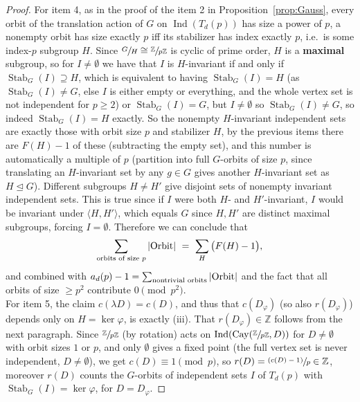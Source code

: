 \documentclass{article}
\theoremstyle{plain}
\theoremstyle{definition}
\theoremstyle{remark}
\newcommand{\Z}{\mathbb{Z}}
\newcommand{\quot}[2]{\sfrac{#1}{#2}}
\DeclareMathOperator{\Cay}{Cay}
\DeclareMathOperator{\Stab}{Stab}
\DeclareMathOperator{\Ind}{Ind}
\begin{document}
\begin{proof}
For item 4, as in the proof of the item 2 in Proposition~\ref{prop:Gauss}, every orbit of the translation action of $G$ on $\Ind(T_d(p))$ has size a power of $p$, a nonempty orbit has size exactly $p$ iff its stabilizer has index exactly $p$, i.e.\ is some index-$p$ subgroup $H$. Since $\sfrac{G}{H}\cong\quot\Z{p\Z}$ is cyclic of prime order, $H$ is a \textbf{maximal} subgroup, so for $I\ne\emptyset$ we have that $I$ is $H$-invariant if and only if $\Stab_G(I)\supseteq H$, which is equivalent to having $\Stab_G(I)=H$ (as $\Stab_G(I)\ne G$, else $I$ is either empty or everything, and the whole vertex set is not independent for $p\ge2$) or $\Stab_G(I)=G$, but $I\ne\emptyset$ so $\Stab_G(I) \ne G$, so indeed $\Stab_G(I)=H$ exactly. So the nonempty $H$-invariant independent sets are exactly those with orbit size $p$ and stabilizer $H$, by the previous items there are $F(H)-1$ of these (subtracting the empty set), and this number is automatically a multiple of $p$ (partition into full $G$-orbits of size $p$, since translating an $H$-invariant set by any $g\in G$ gives another $H$-invariant set as $H\trianglelefteq G$). Different subgroups $H\ne H'$ give disjoint sets of nonempty invariant independent sets. This is true since if $I$ were both $H$- and $H'$-invariant, $I$ would be invariant under $\langle H,H'\rangle$, which equals $G$ since $H,H'$ are distinct maximal subgroups, forcing $I=\emptyset$. Therefore we can conclude that 
\[
\sum_{\text{orbits of size }p}|\textup{Orbit}|\ =\ \sum_H\big(F(H)-1\big),
\]
and combined with $a_d(p)-1=\sum_{\text{nontrivial orbits}}|\textup{Orbit}|$ and the fact that all orbits of size $\ge p^2$ contribute $0\pmod{p^2}$.\\

For item 5, the claim $c(\lambda D)=c(D)$, and thus that $c(D_\varphi)$ (so also $r(D_\varphi)$) depends only on $H=\ker\varphi$, is exactly (iii). That $r(D_\varphi)\in\Z$ follows from the next paragraph. Since $\quot{\Z}{p\Z}$ (by rotation) acts on $\Ind(\Cay(\sfrac{\Z}{p\Z},D))$ for $D\ne\emptyset$ with orbit sizes $1$ or $p$, and only $\emptyset$ gives a fixed point (the full vertex set is never independent, $D\ne\emptyset$), we get $c(D)\equiv1\pmod p$, so $r(D)=\sfrac{(c(D)-1)}{p}\in\Z$, moreover $r(D)$ counts the $G$-orbits of independent sets $I$ of $T_d(p)$ with $\Stab_G(I)=\ker\varphi$, for $D=D_\varphi$.
\end{proof}
\end{document}
